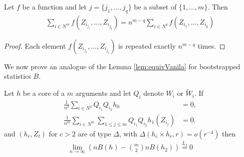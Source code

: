 \begin{lemma}
\label{lem:summingLema}
Let $f$ be a  function and let $j=\{j_1,\ldots,j_q\}$ be a subset of $\{1,\ldots,m\}$. Then
\begin{align*}
\sum_{i \in N^m} f(Z_{i_{j_1}},...,Z_{i_{j_q}})= n^{m-q} \sum_{i \in N^q} f(Z_{i_1},...,Z_{i_q})
\end{align*}
\end{lemma}
\begin{proof}
 Each element $f(Z_{i_{j_1}},...,Z_{i_{j_q}})$ is repeated exactly $n^{m-q}$ times.
\end{proof}


We now prove an analogue of the Lemma \ref{lem:equivVanila} for bootstrapped statistics $B$.


\begin{lemma}
\label{lem:equivBoot}
Let $h$ be a core of a $m$ arguments and let $Q_i$ denote  $W_i$ or  $\tilde W_i$. If  
\begin{align*}
\frac{1} {n^2}  \sum_{i \in N^2}   Q_{i_1} Q_{i_2} h_0 &=0, \\
\frac{1} {n^m}  \sum_{i \in N^m}  \sum_{1 \leq j \leq m } Q_{i_1} Q_{i_2} h_1(Z_{i_j}) &=0.
\end{align*}
and $(h_c,Z_{t})$ for $c>2$  are  of type $\varDelta$, with $\varDelta(h_c \times h_c,r) = o( r^{-4})$ then    
\begin{align*}
  \lim_{n \to \infty} \left( n B(h) -  \binom m 2  n B(h_2)  \right) \overset{L_2}{=} 0
\end{align*}
\end{lemma}

